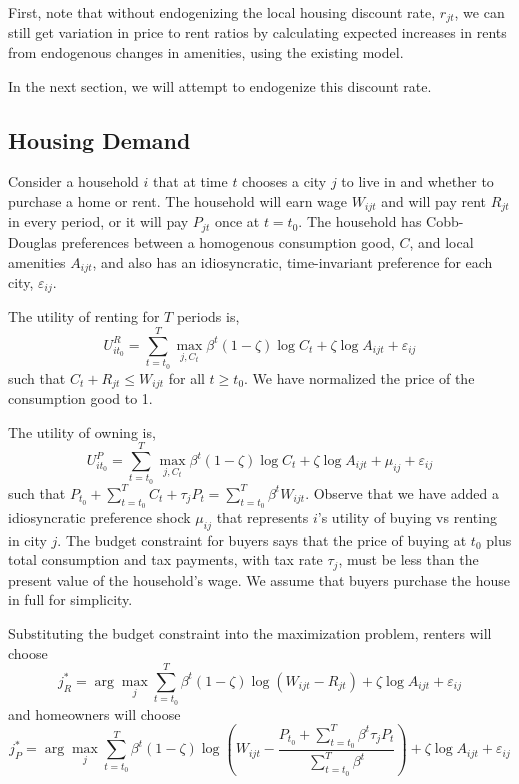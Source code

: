 \documentclass{article}
\begin{document}
First, note that without endogenizing the local housing discount rate, $r_{jt}$, we can still get variation in price to rent ratios by calculating expected increases in rents from endogenous changes in amenities, using the existing model.

In the next section, we will attempt to endogenize this discount rate.

\subsection{Housing Demand}
Consider a household $i$ that at time $t$ chooses a city $j$ to live in and whether to purchase a home or rent. The household will earn wage $W_{ijt}$ and will pay rent $R_{jt}$ in every period, or it will pay $P_{jt}$ once at $t=t_0$. The household has Cobb-Douglas preferences between a homogenous consumption good, $C$, and local amenities $A_{ijt}$, and also has an idiosyncratic, time-invariant preference for each city, $\varepsilon_{ij}$. 

The utility of renting for $T$ periods is,
$$U^R_{it_0} = \sum_{t=t_0}^T\max_{j, C_t} \beta^t (1-\zeta) \log C_t + \zeta \log A_{ijt} + \varepsilon_{ij}$$
such that $C_t + R_{jt} \leq W_{ijt}$ for all $t\geq t_0$. We have normalized the price of the consumption good to 1.

The utility of owning is,
$$U^P_{it_0}= \sum_{t=t_0}^T\max_{j, C_t} \beta^t (1-\zeta) \log C_t + \zeta \log A_{ijt} + \mu_{ij} + \varepsilon_{ij}$$
such that $P_{t_0} + \sum_{t=t_0}^T C_t + \tau_j P_t = \sum_{t=t_0}^T \beta^t W_{ijt}$. Observe that we have added a idiosyncratic preference shock $\mu_{ij}$ that represents $i$'s utility of buying vs renting in city $j$. The budget constraint for buyers says that the price of buying at $t_0$ plus total consumption and tax payments, with tax rate $\tau_j$, must be less than the present value of the household's wage. We assume that buyers purchase the house in full for simplicity.

Substituting the budget constraint into the maximization problem, renters will choose
$$j^*_R = \arg\max_j \sum_{t=t_0}^T \beta^t (1-\zeta) \log (W_{ijt}-R_{jt}) + \zeta \log A_{ijt} + \varepsilon_{ij}$$
and homeowners will choose
$$j^*_P = \arg\max_j \sum_{t=t_0}^T \beta^t (1-\zeta) \log \left(W_{ijt}-\frac{P_{t_0} + \sum_{t=t_0}^T \beta^t \tau_j P_t}{\sum_{t=t_0}^T \beta^t}\right) + \zeta \log A_{ijt} + \varepsilon_{ij}$$
\end{document}
